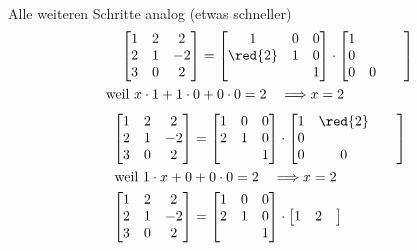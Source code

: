 {\begin{align*}
		\end{align*}
		Alle weiteren Schritte analog (etwas schneller)
		\begin{align*}
			\begin{bmatrix}
				1& 2& 2\\
				2& 1& -2\\
				3& 0& 2 
			\end{bmatrix} &= 
			\begin{bmatrix}
				1 & 0 & 0\\
				\red{2}& 1 & 0\\
				&   & 1
			\end{bmatrix} \cdot
			\begin{bmatrix}
				1 & &&\\
				0 & &\\
				0 & 0&
			\end{bmatrix} \\
			\text{weil } x\cdot 1 + 1\cdot0 &+ 0\cdot0 = 2 \quad \Longrightarrow x = 2
		\end{align*}
		\n 
		\begin{align*}
			\begin{bmatrix}
				1& 2& 2\\
				2& 1& -2\\
				3& 0& 2 
			\end{bmatrix} &= 
			\begin{bmatrix}
				1 & 0 & 0\\
				2& 1 & 0\\
				&  & 1
			\end{bmatrix} \cdot
			\begin{bmatrix}
				1& \red{2}&& \\
				0 & &\\
				0 & 0 &
			\end{bmatrix} \\
			\text{weil } 1\cdot x + 0 &+ 0\cdot 0 = 2 \quad \Longrightarrow x = 2 \\
			\begin{bmatrix}
				1& 2& 2\\
				2& 1& -2\\
				3& 0& 2 
			\end{bmatrix} &= 
			\begin{bmatrix}
				1 & 0 & 0\\
				2& 1 & 0\\
				&  & 1
			\end{bmatrix} \cdot
			\begin{bmatrix}
				1& 2& \\

\end{bmatrix}
\end{align*}}
